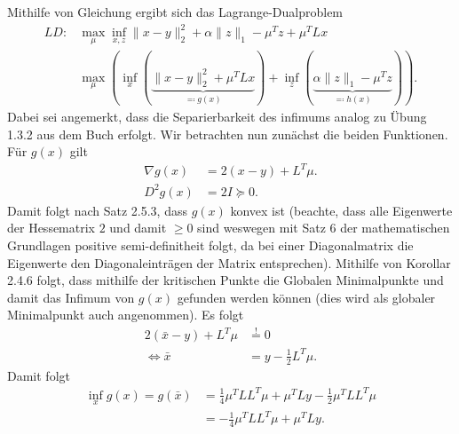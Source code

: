 \documentclass[ngerman, a4paper,12pt]{article}
\begin{document}
Mithilfe von Gleichung  ergibt sich das Lagrange-Dualproblem
\begin{equation*}
	\begin{split}
	LD: &\max_{\mu} \inf_{x,z} \|x-y\|_2^2+\alpha\|z\|_1 - \mu^Tz + \mu^TLx \\
			&\max_{\mu} \left( \inf_{x} \left( \underbrace{\|x-y\|_2^2 + \mu^TLx}_{\eqqcolon g(x)}  \right) + \inf_{z} \left( 
			\underbrace{\alpha\|z\|_1 - \mu^Tz}_{\eqqcolon h(x)}  \right) \right).
	\end{split}
\end{equation*}
Dabei sei angemerkt, dass die Separierbarkeit des infimums analog zu Übung 1.3.2 aus dem Buch erfolgt.
Wir betrachten nun zunächst die beiden Funktionen.
Für $g(x)$ gilt
\begin{equation*}
	\begin{split}
		\nabla g(x) &= 2(x-y) + L^T\mu. \\
		D^2 g(x) &= 2 I \succeq 0.
	\end{split}
\end{equation*}
Damit folgt nach Satz 2.5.3, dass $g(x)$ konvex ist (beachte, dass alle Eigenwerte der Hessematrix $2$ und damit $\geq 0$ sind weswegen mit Satz 6 der mathematischen Grundlagen positive semi-definitheit folgt, da bei einer Diagonalmatrix die Eigenwerte den Diagonaleinträgen der Matrix entsprechen). Mithilfe von Korollar 2.4.6 folgt, dass mithilfe der kritischen Punkte die Globalen Minimalpunkte und damit das Infimum von $g(x)$ gefunden werden können (dies wird als globaler Minimalpunkt auch angenommen). Es folgt
\begin{equation*}
	\begin{split}
	  2( \bar{x}-y)+L^T\mu &\stackrel{!}{=}0 \\
	  \Leftrightarrow \bar{x}&=y-\frac{1}{2} L^T\mu.
	\end{split}
\end{equation*}
Damit folgt 
\begin{equation*}
	\begin{split}
		\inf_x g(x) = g( \bar{x} ) &=\frac{1}{4}\mu^TLL^T\mu+\mu^TLy-\frac{1}{2}\mu^TLL^T\mu \\ &=-\frac{1}{4}\mu^TLL^T\mu+\mu^TLy.
	\end{split}
\end{equation*}
\end{document}
